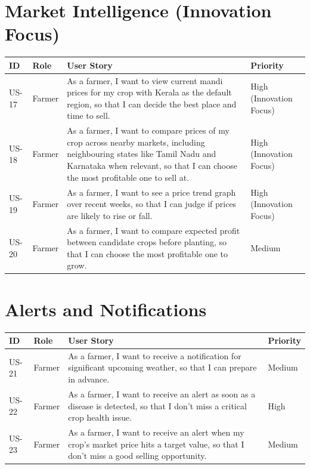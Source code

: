 \documentclass[12pt,a4paper]{article}
\begin{document}
\section{Market Intelligence (Innovation Focus)}
\begin{longtable}{p{1.3cm} p{1.6cm} p{9.3cm} p{1.5cm}}
\toprule
\textbf{ID} & \textbf{Role} & \textbf{User Story} & \textbf{Priority} \\
\midrule
\endhead
US-17 & Farmer & As a farmer, I want to view current mandi prices for my crop with Kerala as the default region, so that I can decide the best place and time to sell. & High (Innovation Focus) \\
US-18 & Farmer & As a farmer, I want to compare prices of my crop across nearby markets, including neighbouring states like Tamil Nadu and Karnataka when relevant, so that I can choose the most profitable one to sell at. & High (Innovation Focus) \\
US-19 & Farmer & As a farmer, I want to see a price trend graph over recent weeks, so that I can judge if prices are likely to rise or fall. & High (Innovation Focus) \\
US-20 & Farmer & As a farmer, I want to compare expected profit between candidate crops before planting, so that I can choose the most profitable one to grow. & Medium \\
\bottomrule
\end{longtable}

\section{Alerts and Notifications}
\begin{longtable}{p{1.3cm} p{1.6cm} p{9.3cm} p{1.5cm}}
\toprule
\textbf{ID} & \textbf{Role} & \textbf{User Story} & \textbf{Priority} \\
\midrule
\endhead
US-21 & Farmer & As a farmer, I want to receive a notification for significant upcoming weather, so that I can prepare in advance. & Medium \\
US-22 & Farmer & As a farmer, I want to receive an alert as soon as a disease is detected, so that I don't miss a critical crop health issue. & High \\
US-23 & Farmer & As a farmer, I want to receive an alert when my crop's market price hits a target value, so that I don't miss a good selling opportunity. & Medium \\
\bottomrule
\end{longtable}
\end{document}
